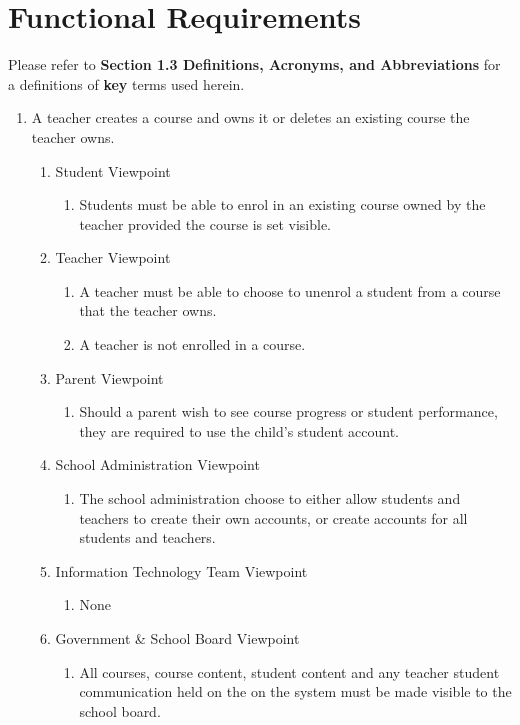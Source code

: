 \documentclass[]{article}
\begin{document}

\section{Functional Requirements}
\label{sec:functional_requirements}

Please refer to \textbf{Section 1.3 Definitions, Acronyms, and Abbreviations}
for a definitions of \textbf{key} terms used herein.


\begin{enumerate}[{BE}1.]
	\item A teacher creates a course and owns it or deletes an existing course the
teacher owns.
	\begin{enumerate}[{VP1}.1]
		\item Student Viewpoint
			\begin{enumerate}
				\item Students must be able to enrol in an existing course owned by the
teacher provided the course is set visible.
			\end{enumerate}
		\item Teacher Viewpoint
			\begin{enumerate}
				\item A teacher must be able to choose to unenrol a student from a course
that the teacher owns.
				\item A teacher is not enrolled in a course.
			\end{enumerate}
		\item Parent Viewpoint
			\begin{enumerate}
				\item Should a parent wish to see course progress or student performance,
they are required to use the child's student account.
			\end{enumerate}
		\item School Administration Viewpoint
			\begin{enumerate}
				\item The school administration choose to either allow students and teachers
to create their own accounts, or create accounts for all students and teachers.
			\end{enumerate}
		\item Information Technology Team Viewpoint
			\begin{enumerate}
				\item None
			\end{enumerate}
		\item Government \& School Board Viewpoint
			\begin{enumerate}
				\item All courses, course content, student content and any teacher student
communication held on the on the system must be made visible to the school
board.
			\end{enumerate}
	\end{enumerate}


\end{enumerate}
\end{document}
